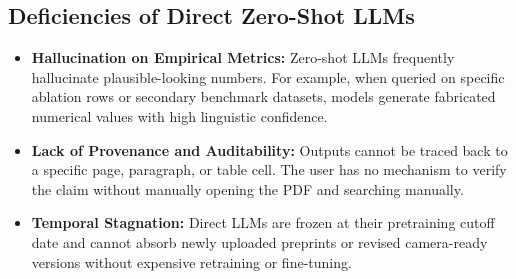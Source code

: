 \documentclass[12pt,a4paper,oneside]{report}
\begin{document}
\subsection{Deficiencies of Direct Zero-Shot LLMs}
\begin{itemize}
    \item \textbf{Hallucination on Empirical Metrics:} Zero-shot LLMs frequently hallucinate plausible-looking numbers. For example, when queried on specific ablation rows or secondary benchmark datasets, models generate fabricated numerical values with high linguistic confidence.
    \item \textbf{Lack of Provenance and Auditability:} Outputs cannot be traced back to a specific page, paragraph, or table cell. The user has no mechanism to verify the claim without manually opening the PDF and searching manually.
    \item \textbf{Temporal Stagnation:} Direct LLMs are frozen at their pretraining cutoff date and cannot absorb newly uploaded preprints or revised camera-ready versions without expensive retraining or fine-tuning.
\end{itemize}
\end{document}
